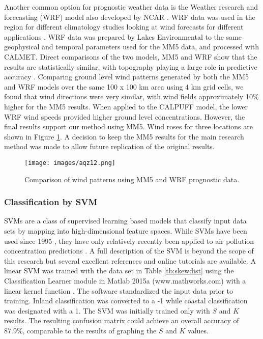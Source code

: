 Another common option for prognostic weather data is the Weather research and forecasting (WRF) model also developed by NCAR \citep{Skamarock2008}. WRF data was used in the region for different climatology studies looking at wind forecasts for different applications \citep{Amjad2015}. WRF data was prepared by Lakes Environmental to the same geophysical and temporal parameters used for the MM5 data, and processed with CALMET. Direct comparisons of the two models, MM5 and WRF show that the results are statistically similar, with topography playing a large role in predictive accuracy \citep{Gsella2014, Henmi2004}. Comparing ground level wind patterns generated by both the MM5 and WRF models over the same 100 x 100 km area using 4 km grid cells, we found that wind directions were very similar, with wind fields approximately 10\% higher for the MM5 results. When applied to the CALPUFF model, the lower WRF wind speeds provided higher ground level concentrations. However, the final results support our method using MM5. Wind roses for three locations are shown in Figure \ref{fig:12windcompare}. A decision to keep the MM5 results for the main research method was made to allow future replication of the original results.
      
%
\begin{figure}[H]
\centering
\texttt{[image: images/aqz12.png]} 
\caption[Comparison of wind patterns using prognostic data]{Comparison of wind patterns using MM5 and WRF prognostic data.}
\label{fig:12windcompare}
\end{figure}
%

\subsubsection{Classification by SVM}

SVMs are a class of supervised learning based models that classify input data sets by mapping into high-dimensional feature spaces. While SVMs have been used since 1995 \citep{Cortes1995}, they have only relatively recently been applied to air pollution concentration predictions \citep{Lu2005, Luna2014, Moazami2016}. A full description of the SVM is beyond the scope of this research but several excellent references and online tutorials are available. A linear SVM was trained with the data set in Table \ref{tb:skewdist} using the Classification Learner module in Matlab 2015a (www.mathworks.com) with a linear kernel function \citep{Yang2011}. The software standardized the input data prior to training. Inland classification was converted to a -1 while coastal classification was designated with a 1. The SVM was initially trained only with $S$ and $K$ results. The resulting confusion matrix could achieve an overall accuracy of 87.9\%, comparable to the results of graphing the $S$ and $K$ values.  

